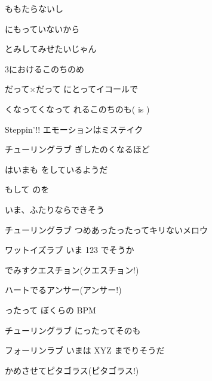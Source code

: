 \documentclass[a4paper,tate,twocolumn,12pt]{ltjtarticle}
\begin{document}
\begin{flushleft}
\begin{minipage}{\linewidth}
ももたらないし

にもっていないから

とみしてみせたいじゃん

3におけるこのちのめ
\end{minipage}

\vspace{2em}

\noindent\begin{minipage}{\linewidth}
だって×だって にとってイコールで

くなってくなって れるこのちのも( is )

Steppin'!! エモーションはミステイク

チューリングラブ ぎしたのくなるほど

はいまも をしているようだ

もして のを

いま、ふたりならできそう
\end{minipage}

\vspace{2em}

\noindent\begin{minipage}{\linewidth}
チューリングラブ つめあったったってキリないメロウ

ワットイズラブ いま 123 でそうか

でみすクエスチョン(クエスチョン!)

ハートでるアンサー(アンサー!)

ったって ぼくらの BPM

チューリングラブ にったってそのも

フォーリンラブ いまは XYZ までりそうだ

かめさせてピタゴラス(ピタゴラス!)


\end{minipage}
\end{flushleft}
\end{document}
